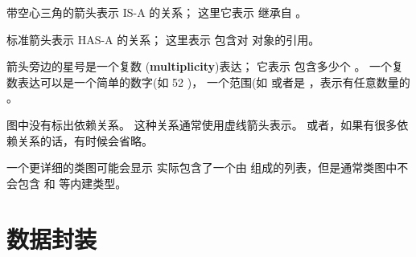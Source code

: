 
带空心三角的箭头表示 IS-A 的关系； 这里它表示  继承自  。


标准箭头表示 HAS-A 的关系； 这里表示  包含对  对象的引用。



箭头旁边的星号是一个复数 ({\bf multiplicity})表达；
它表示  包含多少个 。
一个复数表达可以是一个简单的数字(如 52 )，
一个范围(如  或者是 \li{*}，表示有任意数量的  。


图中没有标出依赖关系。  这种关系通常使用虚线箭头表示。
或者，如果有很多依赖关系的话，有时候会省略。


一个更详细的类图可能会显示  实际包含了一个由  组成的列表，但是通常类图中不会包含  和  等内建类型。


\section{数据封装}


